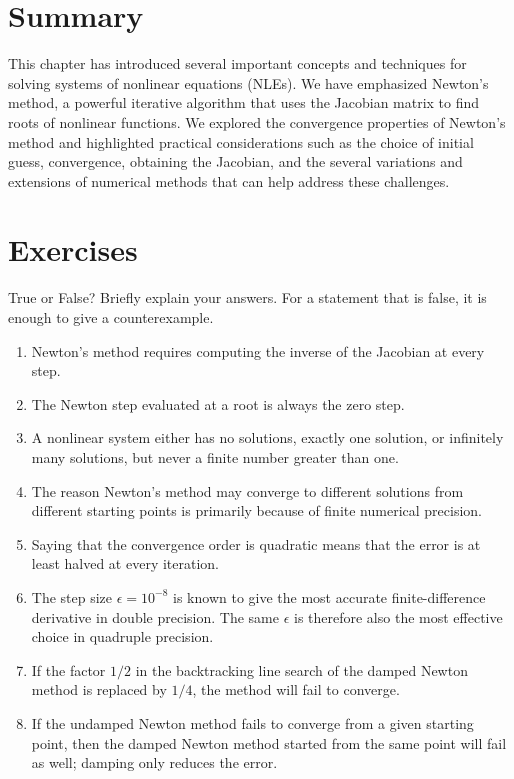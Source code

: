 \begin{exampleBox}
\end{exampleBox}


\section{Summary}
This chapter has introduced several important concepts and techniques for solving systems of nonlinear equations (NLEs). We have emphasized Newton's method, a powerful iterative algorithm that uses the Jacobian matrix to find roots of nonlinear functions. We explored the convergence properties of Newton's method and highlighted practical considerations such as the choice of initial guess, convergence, obtaining the Jacobian, and the several variations and extensions of numerical methods that can help address these challenges.


\section{Exercises}

\begin{exercise} %
    \label{ex:tf-nle}
    
    True or False? Briefly explain your answers. For a statement that is false, it is enough to give a counterexample.
    \begin{enumerate}[label=(\alph*)]
        \item Newton's method requires computing the inverse of the Jacobian at every step.
        \item The Newton step evaluated at a root is always the zero step.
        \item A nonlinear system either has no solutions, exactly one solution, or infinitely many solutions, but never a finite number greater than one.
        \item The reason Newton's method may converge to different solutions from different starting points is  primarily because of finite numerical precision.
        \item Saying that the convergence order is quadratic means that the error is at least halved at every iteration.
        \item The step size $\epsilon = 10^{-8}$ is known to give the most accurate finite-difference derivative in double precision. The same $\epsilon$ is therefore also the most effective choice in quadruple precision.
        \item If the factor $1/2$ in the backtracking line search of the damped Newton method is replaced by $1/4$, the method will fail to converge.
        \item If the undamped Newton method fails to converge from a given starting point, then the damped Newton method started from the same point will fail as well; damping only reduces the error.
    \end{enumerate}
    
\end{exercise}

